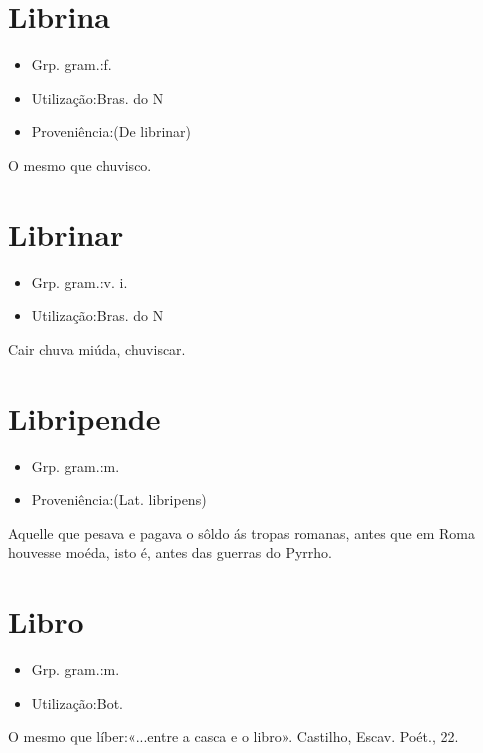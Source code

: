 \section{Librina}
\begin{itemize}
\item {Grp. gram.:f.}
\end{itemize}
\begin{itemize}
\item {Utilização:Bras. do N}
\end{itemize}
\begin{itemize}
\item {Proveniência:(De \textunderscore librinar\textunderscore )}
\end{itemize}
O mesmo que \textunderscore chuvisco\textunderscore .
\section{Librinar}
\begin{itemize}
\item {Grp. gram.:v. i.}
\end{itemize}
\begin{itemize}
\item {Utilização:Bras. do N}
\end{itemize}
Cair chuva miúda, chuviscar.
\section{Libripende}
\begin{itemize}
\item {Grp. gram.:m.}
\end{itemize}
\begin{itemize}
\item {Proveniência:(Lat. \textunderscore libripens\textunderscore )}
\end{itemize}
Aquelle que pesava e pagava o sôldo ás tropas romanas, antes que em Roma houvesse moéda, isto é, antes das guerras do Pyrrho.
\section{Libro}
\begin{itemize}
\item {Grp. gram.:m.}
\end{itemize}
\begin{itemize}
\item {Utilização:Bot.}
\end{itemize}
O mesmo que \textunderscore líber\textunderscore :«\textunderscore ...entre a casca e o libro\textunderscore ». Castilho, \textunderscore Escav. Poét.\textunderscore , 22.
